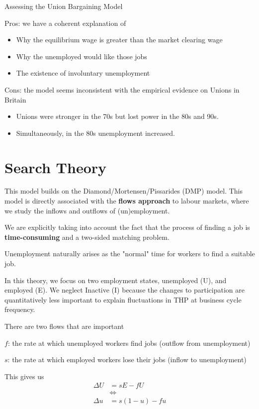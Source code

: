 \documentclass[11pt]{article}
\begin{document}
\begin{shaded}
    Assessing the Union Bargaining Model

    Pros: we have a coherent explanation of
    \begin{itemize}
        \item Why the equilibrium wage is greater than the market clearing wage
        \item Why the unemployed would like those jobs
        \item The existence of involuntary unemployment
    \end{itemize}
    Cons: the model seems inconsistent with the empirical evidence on Unions in Britain
    \begin{itemize}
        \item Unions were stronger in the 70s but lost power in the 80s and 90s. 
        \item Simultaneously, in the 80s unemployment increased.
    \end{itemize}
\end{shaded}


\section{Search Theory}

This model builds on the Diamond/Mortensen/Pissarides (DMP) model. This model is directly associated with the \textbf{flows approach} to labour markets, where we study the inflows and outflows of (un)employment.

We are explicitly taking into account the fact that the process of finding a job is \textbf{time-consuming} and a two-sided matching problem.

\begin{note}
    Unemployment naturally arises as the "normal" time for workers to find a suitable job.
\end{note}

In this theory, we focus on two employment states, unemployed (U), and employed (E). We neglect Inactive (I) because the changes to participation are quantitatively less important to explain fluctuations in THP at business cycle frequency.

\begin{shaded}
    There are two flows that are important

    $f$: the rate at which unemployed workers find jobs (outflow from unemployment)

    $s$: the rate at which employed workers lose their jobs (inflow to unemployment)

    This gives us
    \begin{align*}
      \Delta U &= sE - fU  \\
      &\Leftrightarrow \\
      \Delta u &= s(1-u) - fu
    \end{align*}
    \[\]
\end{shaded}
\end{document}
